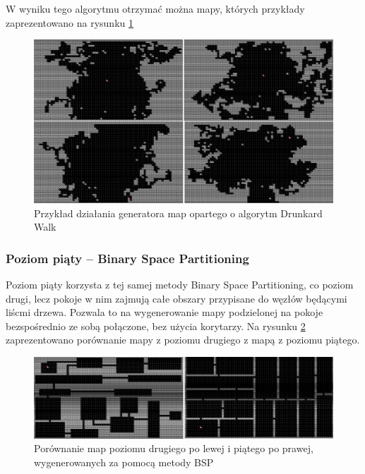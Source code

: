 \documentclass[12pt,twoside]{article}
\begin{document}
W wyniku tego algorytmu otrzymać można mapy, których przykłady zaprezentowano na rysunku \ref{generators:drunkard_walk} 

\FloatBarrier
\begin{figure}[h]
	\centering
	\includegraphics[width=16cm]{images/generators/drunkard_walk.png}
	\caption{Przykład działania generatora map opartego o algorytm Drunkard Walk}
	\label{generators:drunkard_walk}
\end{figure}
\FloatBarrier

\clearpage

\subsubsection{Poziom piąty -- Binary Space Partitioning}
Poziom piąty korzysta z tej samej metody Binary Space Partitioning, co poziom drugi, lecz pokoje w nim zajmują całe obszary przypisane do węzłów będącymi liścmi drzewa. Pozwala to na wygenerowanie mapy podzielonej na pokoje bezspośrednio ze sobą połączone, bez użycia korytarzy. Na rysunku \ref{generators:bsp_diff} zaprezentowano porównanie mapy z poziomu drugiego z mapą z poziomu piątego.
	
\FloatBarrier
\begin{figure}[h]
	\centering
	\includegraphics[width=16cm]{images/generators/bsp_diff.png}
	\caption{Porównanie map poziomu drugiego po lewej i piątego po prawej, wygenerowanych za pomocą metody BSP}
	\label{generators:bsp_diff}
\end{figure}
\FloatBarrier
\end{document}
